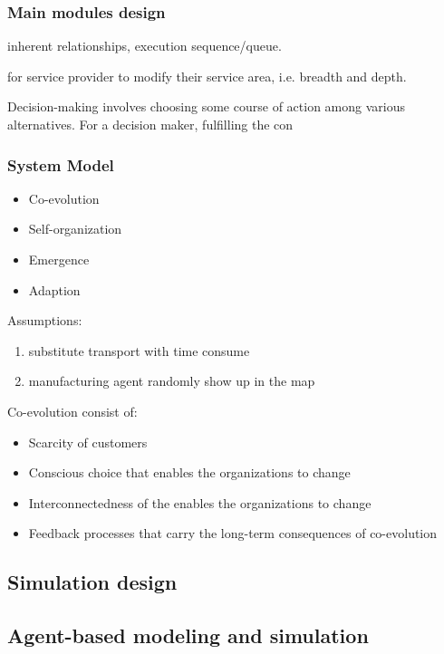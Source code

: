 \subsubsection{Main modules design}
\label{subsub:main_modules}
inherent relationships, execution sequence/queue.

for service provider to modify their service area, i.e. breadth and depth.

Decision-making involves choosing some course of action among various alternatives. For a decision maker, fulfilling the con

\subsubsection{System Model}
\begin{itemize}
    \item Co-evolution
    \item Self-organization
    \item Emergence
    \item Adaption
\end{itemize}

Assumptions:
\begin{enumerate}
    \item substitute transport with time consume
    \item manufacturing agent randomly show up in the map
\end{enumerate}

Co-evolution consist of:
\begin{itemize}
    \item Scarcity of customers
    \item Conscious choice that enables the organizations to change
    \item Interconnectedness of the enables the organizations to change
    \item Feedback processes that carry the long-term consequences of co-evolution
\end{itemize}


\subsection{Simulation design} %
\label{sub:simulation_design}


\subsection{Agent-based modeling and simulation} %
\label{sub:agent_based_modeling_and_simulation}

